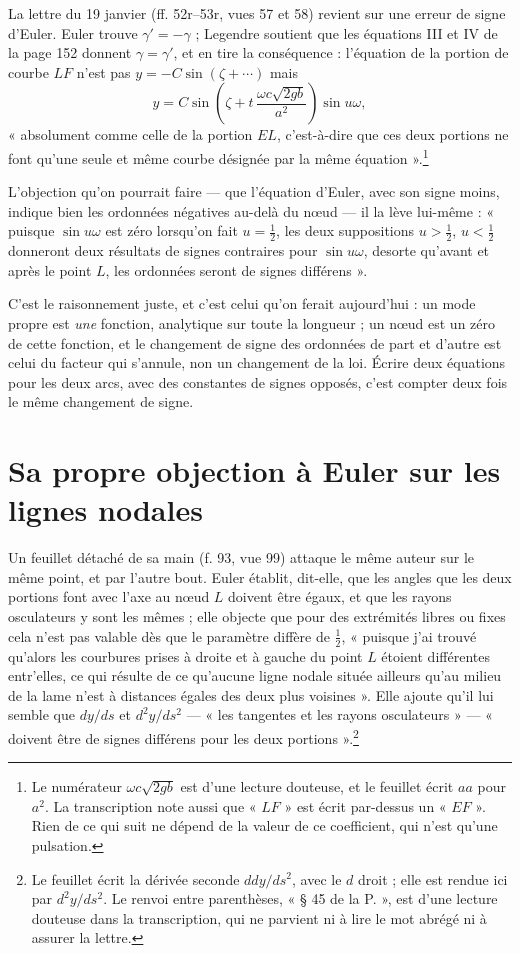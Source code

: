 \documentclass[11pt,a4paper]{article}
\begin{document}
La lettre du 19 janvier (ff. 52r–53r, vues 57 et 58) revient sur une erreur de
signe d'Euler. Euler trouve $\gamma' = -\gamma$ ; Legendre soutient que les
équations III et IV de la page 152 donnent $\gamma = \gamma'$, et en tire la
conséquence : l'équation de la portion de courbe $LF$ n'est pas
$y = -C\sin(\zeta + \cdots)$ mais
\[
  y = C \sin\!\left(\zeta + t\,\frac{\omega c \sqrt{2gb}}{a^2}\right)\sin u\omega,
\]
« absolument comme celle de la portion $EL$, c'est-à-dire que ces deux
portions ne font qu'une seule et même courbe désignée par la même
équation ».\footnote{Le numérateur $\omega c\sqrt{2gb}$ est d'une lecture
douteuse, et le feuillet écrit $aa$ pour $a^2$. La transcription note aussi
que « $LF$ » est écrit par-dessus un « $EF$ ». Rien de ce qui suit ne dépend de
la valeur de ce coefficient, qui n'est qu'une pulsation.}

L'objection qu'on pourrait faire — que l'équation d'Euler, avec son signe
moins, indique bien les ordonnées négatives au-delà du nœud — il la lève
lui-même : « puisque $\sin u\omega$ est zéro lorsqu'on fait $u = \frac12$, les
deux suppositions $u > \frac12$, $u < \frac12$ donneront deux résultats de
signes contraires pour $\sin u\omega$, desorte qu'avant et après le point $L$,
les ordonnées seront de signes différens ».

C'est le raisonnement juste, et c'est celui qu'on ferait aujourd'hui : un mode
propre est \emph{une} fonction, analytique sur toute la longueur ; un nœud est
un zéro de cette fonction, et le changement de signe des ordonnées de part et
d'autre est celui du facteur qui s'annule, non un changement de la loi. Écrire
deux équations pour les deux arcs, avec des constantes de signes opposés, c'est
compter deux fois le même changement de signe.

\section*{Sa propre objection à Euler sur les lignes nodales}

Un feuillet détaché de sa main (f. 93, vue 99) attaque le même auteur sur le
même point, et par l'autre bout. Euler établit, dit-elle, que les angles que
les deux portions font avec l'axe au nœud $L$ doivent être égaux, et que les
rayons osculateurs y sont les mêmes ; elle objecte que pour des extrémités
libres ou fixes cela n'est pas valable dès que le paramètre diffère de
$\frac12$, « puisque j'ai trouvé qu'alors les courbures prises à droite et à
gauche du point $L$ étoient différentes entr'elles, ce qui résulte de ce
qu'aucune ligne nodale située ailleurs qu'au milieu de la lame n'est à
distances égales des deux plus voisines ». Elle ajoute qu'il lui semble que
$dy/ds$ et $d^2y/ds^2$ — « les tangentes et les rayons osculateurs » —
« doivent être de signes différens pour les deux portions ».\footnote{Le
feuillet écrit la dérivée seconde $ddy/ds^2$, avec le $d$ droit ; elle est
rendue ici par $d^2y/ds^2$. Le renvoi entre parenthèses, « § 45 de la
P. », est d'une lecture douteuse dans la transcription, qui ne parvient
ni à lire le mot abrégé ni à assurer la lettre.}
\end{document}
